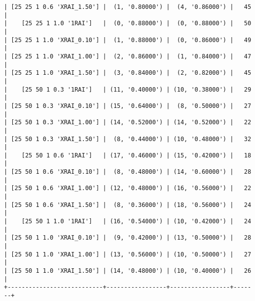\documentclass{article}
\begin{document}
\begin{verbatim}
| [25 25 1 0.6 'XRAI_1.50'] |  (1, '0.80000') |  (4, '0.86000') |   45  |
|    [25 25 1 1.0 '1RAI']   |  (0, '0.88000') |  (0, '0.88000') |   50  |
| [25 25 1 1.0 'XRAI_0.10'] |  (1, '0.88000') |  (0, '0.86000') |   49  |
| [25 25 1 1.0 'XRAI_1.00'] |  (2, '0.86000') |  (1, '0.84000') |   47  |
| [25 25 1 1.0 'XRAI_1.50'] |  (3, '0.84000') |  (2, '0.82000') |   45  |
|    [25 50 1 0.3 '1RAI']   | (11, '0.40000') | (10, '0.38000') |   29  |
| [25 50 1 0.3 'XRAI_0.10'] | (15, '0.64000') |  (8, '0.50000') |   27  |
| [25 50 1 0.3 'XRAI_1.00'] | (14, '0.52000') | (14, '0.52000') |   22  |
| [25 50 1 0.3 'XRAI_1.50'] |  (8, '0.44000') | (10, '0.48000') |   32  |
|    [25 50 1 0.6 '1RAI']   | (17, '0.46000') | (15, '0.42000') |   18  |
| [25 50 1 0.6 'XRAI_0.10'] |  (8, '0.48000') | (14, '0.60000') |   28  |
| [25 50 1 0.6 'XRAI_1.00'] | (12, '0.48000') | (16, '0.56000') |   22  |
| [25 50 1 0.6 'XRAI_1.50'] |  (8, '0.36000') | (18, '0.56000') |   24  |
|    [25 50 1 1.0 '1RAI']   | (16, '0.54000') | (10, '0.42000') |   24  |
| [25 50 1 1.0 'XRAI_0.10'] |  (9, '0.42000') | (13, '0.50000') |   28  |
| [25 50 1 1.0 'XRAI_1.00'] | (13, '0.56000') | (10, '0.50000') |   27  |
| [25 50 1 1.0 'XRAI_1.50'] | (14, '0.48000') | (10, '0.40000') |   26  |
+---------------------------+-----------------+-----------------+-------+
\end{verbatim}

\begin{verbatim}

\end{verbatim}
\end{document}
